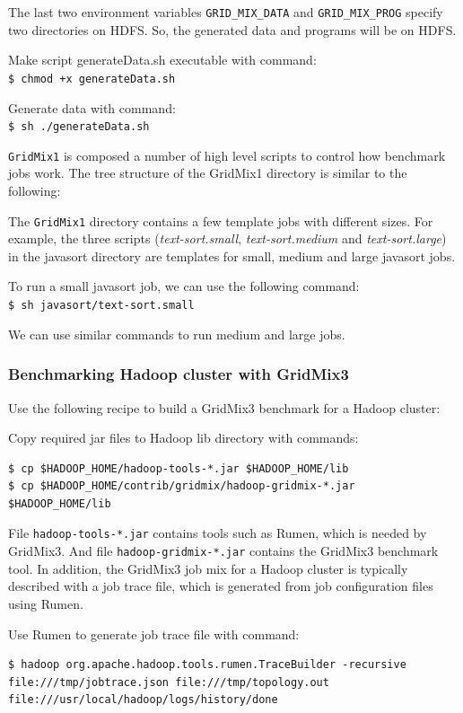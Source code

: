 The last two environment variables \verb|GRID_MIX_DATA| and \verb|GRID_MIX_PROG| specify two directories on HDFS. So, the generated data and programs will be on HDFS.

Make script generateData.sh executable with command: \\
\verb|$ chmod +x generateData.sh|

Generate data with command: \\
\verb|$ sh ./generateData.sh|

\verb|GridMix1| is composed a number of high level scripts to control how benchmark jobs work. The tree structure of the GridMix1 directory is similar to the following:

The \verb|GridMix1| directory contains a few template jobs with different sizes. For example, the three scripts (\emph{text-sort.small}, \emph{text-sort.medium} and \emph{text-sort.large}) in the javasort directory are templates for small, medium and large javasort jobs.

To run a small javasort job, we can use the following command:\\
\verb|$ sh javasort/text-sort.small|

We can use similar commands to run medium and large jobs.

\subsubsection*{Benchmarking Hadoop cluster with GridMix3}
Use the following recipe to build a GridMix3 benchmark for a Hadoop cluster:

Copy required jar files to Hadoop lib directory with commands:
\lstset{style=bashstyle}
\begin{lstlisting}
$ cp $HADOOP_HOME/hadoop-tools-*.jar $HADOOP_HOME/lib
$ cp $HADOOP_HOME/contrib/gridmix/hadoop-gridmix-*.jar $HADOOP_HOME/lib
\end{lstlisting}

File \verb|hadoop-tools-*.jar| contains tools such as Rumen, which is needed by GridMix3. And file \verb|hadoop-gridmix-*.jar| contains the GridMix3 benchmark tool. In addition, the GridMix3 job mix for a Hadoop cluster is typically described with a job trace file, which is generated from job configuration files using Rumen.

Use Rumen to generate job trace file with command:
\lstset{style=bashstyle}
\begin{lstlisting}
$ hadoop org.apache.hadoop.tools.rumen.TraceBuilder -recursive file:///tmp/jobtrace.json file:///tmp/topology.out file:///usr/local/hadoop/logs/history/done
\end{lstlisting}

